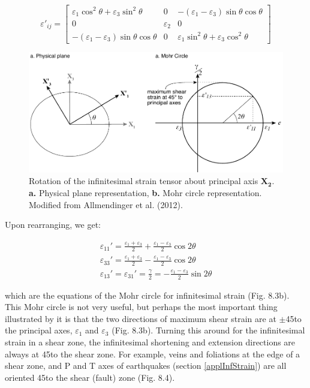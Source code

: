 \documentclass[a4paper , 12pt]{book}
\begin{document}
\begin{equation}
    \varepsilon'_{ij}=\begin{bmatrix}\varepsilon_1\cos^2\theta+\varepsilon_3\sin^2\theta&0&-(\varepsilon_1-\varepsilon_3)\sin\theta\cos\theta\\0&\varepsilon_2&0\\-(\varepsilon_1-\varepsilon_3)\sin\theta\cos\theta&0&\varepsilon_1\sin^2\theta+\varepsilon_3\cos^2\theta\end{bmatrix}
\end{equation}

\begin{figure}[ht]
    \centering
    \includegraphics[width=13.0cm]{ch8f3.pdf}
    \caption{Rotation of the infinitesimal strain tensor about principal axis $\mathbf{X_2}$. \textbf{a.} Physical plane representation, \textbf{b.} Mohr circle representation. Modified from Allmendinger et al. (2012).}
\end{figure}

Upon rearranging, we get:

\begin{equation}
    \begin{gathered}
        \varepsilon_{11}'=\frac{\varepsilon_1+\varepsilon_3}{2}+\frac{\varepsilon_1-\varepsilon_3}{2}\cos 2\theta \\
        \varepsilon_{33}'=\frac{\varepsilon_1+\varepsilon_3}{2}-\frac{\varepsilon_1-\varepsilon_3}{2}\cos 2\theta \\
        \varepsilon_{13}'=\varepsilon_{31}'=\frac{\gamma}{2}=-\frac{\varepsilon_1-\varepsilon_3}{2}\sin 2\theta
    \end{gathered}
\end{equation}

which are the equations of the Mohr circle for infinitesimal strain (Fig. 8.3b). This Mohr circle is not very useful, but perhaps the most important thing illustrated by it is that the two directions of maximum shear strain are at $\pm$45\degree\space to the principal axes, $\varepsilon_1$ and $\varepsilon_3$ (Fig. 8.3b). Turning this around for the infinitesimal strain in a shear zone, the infinitesimal shortening and extension directions are always at 45\degree\space to the shear zone. For example, veins and foliations at the edge of a shear zone, and P and T axes of earthquakes (section \ref{applInfStrain}) are all oriented 45\degree\space to the shear (fault) zone (Fig. 8.4).
\end{document}
